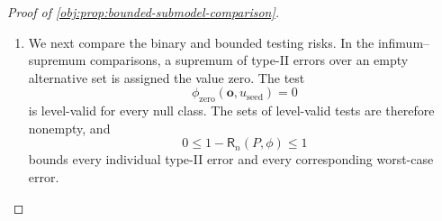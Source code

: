 \documentclass[11pt]{article}
\begin{document}
\begin{proof}[Proof of \cref{obj:prop:bounded-submodel-comparison}]
\begin{enumerate}
Now let \(n\in\mathbb N\), let \(\phi\) be a measurable \([0,1]\)-valued test, and write its input as
\[
\boldsymbol o=(o_i)_{i=1}^n\in\mathcal O^n,\qquad
o_i=(x_i,a_{\mathrm{obs},i},y_i),\qquad
u_{\mathrm{seed}}\in[0,1].
\]
Define its integrated rejection map by
\[
\widetilde\phi(\boldsymbol o,u_{\mathrm{seed}})
=
\sum_{\boldsymbol b_{\mathrm{sign}}\in\{-1,1\}^n}
\phi\!\left(
 ((x_i,a_{\mathrm{obs},i},b_{\mathrm{sign},i}))_{i=1}^n,
 u_{\mathrm{seed}}
\right)
\prod_{i=1}^n
\frac{1+b_{\mathrm{sign},i}\ell_1(y_i)}2,
\qquad
\boldsymbol b_{\mathrm{sign}}
=(b_{\mathrm{sign},i})_{i=1}^n.
\]
Its weights are nonnegative and satisfy
\[
\sum_{\boldsymbol b_{\mathrm{sign}}\in\{-1,1\}^n}
\prod_{i=1}^n
\frac{1+b_{\mathrm{sign},i}\ell_1(y_i)}2
=
\prod_{i=1}^n
\left(
\frac{1+\ell_1(y_i)}2+\frac{1-\ell_1(y_i)}2
\right)=1.
\]
Thus \(\widetilde\phi\) is measurable and takes values in \([0,1]\). For \(n=0\), the sign-vector set contains the single empty vector and the empty product is one, so the same definition applies.

The finite sum is the integral of \(\phi\) against the independent product of the record kernels. Independence and the one-record identity imply
\[
\int_{\mathcal O^n}
\bigotimes_{i=1}^n\mathsf K_{\mathrm{sign}}(o_i,\cdot)\,
P^{\otimes n}(d\boldsymbol o)
=
\mathcal C_{\mathrm{bin}}(P)^{\otimes n}.
\]
This follows by factorization on measurable rectangles; the empty product gives the identity for \(n=0\). Hence, for every fixed \(u_{\mathrm{seed}}\),
\[
\int_{\mathcal O^n}
\widetilde\phi(\boldsymbol o,u_{\mathrm{seed}})
\,P^{\otimes n}(d\boldsymbol o)
=
\int_{\mathcal O^n}
\phi(\boldsymbol o,u_{\mathrm{seed}})
\,\mathcal C_{\mathrm{bin}}(P)^{\otimes n}(d\boldsymbol o).
\]
Integrating in the public seed and using the experiment of
\cref{obj:def:original-record-experiment} gives
\[
\mathsf R_n(P,\widetilde\phi)
=
\mathsf R_n(\mathcal C_{\mathrm{bin}}(P),\phi).
\]
Boundedness of the tests justifies the integral exchanges. On bounded records, the kernel uses exactly the probabilities \((1+Y)/2\) and \((1-Y)/2\) stated in the proposition.

\item We next compare the binary and bounded testing risks. In the infimum--supremum comparisons, a supremum of type-II errors over an empty alternative set is assigned the value zero. The test
\[
\phi_{\mathrm{zero}}(\boldsymbol o,u_{\mathrm{seed}})=0
\]
is level-valid for every null class. The sets of level-valid tests are therefore nonempty, and
\[
0\le 1-\mathsf R_n(P,\phi)\le1
\]
bounds every individual type-II error and every corresponding worst-case error.


\end{enumerate}
\end{proof}
\end{document}
